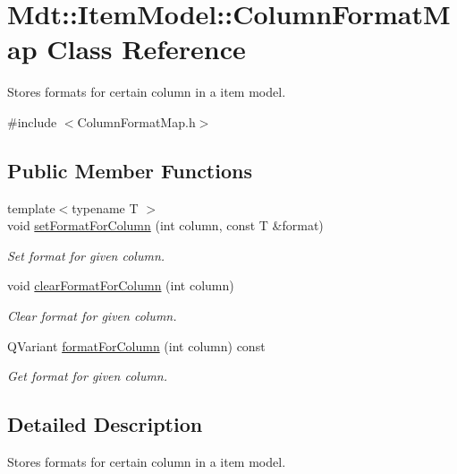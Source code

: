 \hypertarget{class_mdt_1_1_item_model_1_1_column_format_map}{}\section{Mdt\+:\+:Item\+Model\+:\+:Column\+Format\+Map Class Reference}
\label{class_mdt_1_1_item_model_1_1_column_format_map}


Stores formats for certain column in a item model.  




{\ttfamily \#include $<$Column\+Format\+Map.\+h$>$}

\subsection*{Public Member Functions}
\begin{DoxyCompactItemize}
\item 
{\footnotesize template$<$typename T $>$ }\\void \hyperlink{class_mdt_1_1_item_model_1_1_column_format_map_ad6fa4094d20c849c97dfeb102eb09195}{set\+Format\+For\+Column} (int column, const T \&format)
\begin{DoxyCompactList}\small\item\em Set format for given column. \end{DoxyCompactList}\item 
void \hyperlink{class_mdt_1_1_item_model_1_1_column_format_map_a5e78d3d3eaed6dd2da3e5201541d9a9a}{clear\+Format\+For\+Column} (int column)
\begin{DoxyCompactList}\small\item\em Clear format for given column. \end{DoxyCompactList}\item 
Q\+Variant \hyperlink{class_mdt_1_1_item_model_1_1_column_format_map_adaeb39ac9dfcb16d4cd2f03b530e7380}{format\+For\+Column} (int column) const 
\begin{DoxyCompactList}\small\item\em Get format for given column. \end{DoxyCompactList}\end{DoxyCompactItemize}


\subsection{Detailed Description}
Stores formats for certain column in a item model. 

